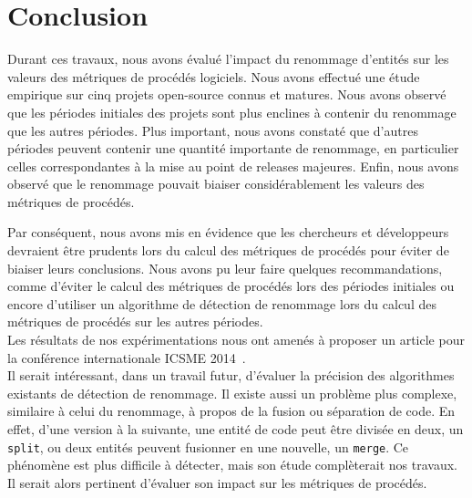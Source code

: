 \section{Conclusion}
\label{sec:conclusion}

Durant ces travaux, nous avons évalué l'impact du renommage d'entités sur les valeurs des métriques de procédés logiciels. Nous avons effectué une étude empirique sur cinq projets open-source connus et matures. Nous avons observé que les périodes initiales des projets sont plus enclines à contenir du renommage que les autres périodes. Plus important, nous avons constaté que d'autres périodes peuvent contenir une quantité importante de renommage, en particulier celles correspondantes à la mise au point de releases majeures. Enfin, nous avons observé que le renommage pouvait biaiser considérablement les valeurs des métriques de procédés. 

Par conséquent, nous avons mis en évidence que les chercheurs et développeurs devraient être prudents lors du calcul des métriques de procédés pour éviter de biaiser leurs conclusions. Nous avons pu leur faire quelques recommandations, comme d’éviter le calcul des métriques de procédés lors des périodes initiales ou encore d’utiliser un algorithme de détection de renommage lors du calcul des métriques de procédés sur les autres périodes.\\

Les résultats de nos expérimentations nous ont amenés à proposer un article pour la conférence internationale ICSME 2014~\cite{icsme_2014}.\\

Il serait intéressant, dans un travail futur, d'évaluer la précision des algorithmes existants de détection de renommage. Il existe aussi un problème plus complexe, similaire à celui du renommage, à propos de la fusion ou séparation de code. En effet, d'une version à la suivante, une entité de code peut être divisée en deux, un \texttt{split}, ou deux entités peuvent fusionner en une nouvelle, un \texttt{merge}. Ce phénomène est plus difficile à détecter, mais son étude complèterait nos travaux. Il serait alors pertinent d'évaluer son impact sur les métriques de procédés. \\

